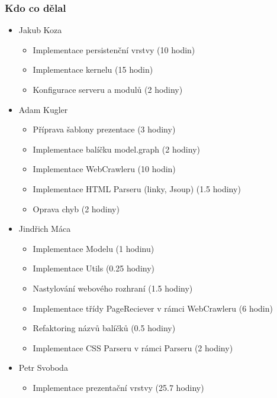 \documentclass{beamer}
\begin{document}
\begin{frame}[allowframebreaks]\frametitle{Kdo co dělal} 
  \begin{itemize}
    \item Jakub Koza
      \begin{itemize}
       \item Implementace persistenční vrstvy (10 hodin)
       \item Implementace kernelu (15 hodin)
       \item Konfigurace serveru a modulů (2 hodiny)
     \end{itemize}    

    \item Adam Kugler
      \begin{itemize}
       \item Příprava šablony prezentace (3 hodiny)
       \item Implementace balíčku model.graph (2 hodiny)
       \item Implementace WebCrawleru (10 hodin)
       \item Implementace HTML Parseru (linky, Jsoup) (1.5 hodiny)
       \item Oprava chyb (2 hodiny)
     \end{itemize}

    \item Jindřich Máca
      \begin{itemize}
       \item Implementace Modelu (1 hodinu)
			 \item Implementace Utils (0.25 hodiny)
			 \item Nastylování webového rozhraní (1.5 hodiny)
			 \item Implementace třídy PageReciever v rámci WebCrawleru (6 hodin)
			 \item Refaktoring názvů balíčků (0.5 hodiny)
			 \item Implementace CSS Parseru v rámci Parseru (2 hodiny)
     \end{itemize}

    \item Petr Svoboda
      \begin{itemize}
      \item Implementace prezentační vrstvy (25.7 hodiny)
     \end{itemize}
   \end{itemize}  
\end{frame} 
\end{document}
